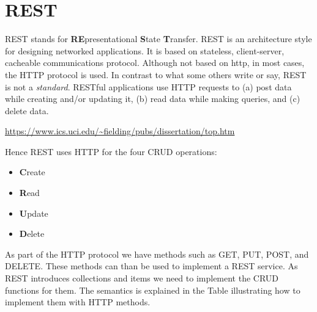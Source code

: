 

\chapter{REST}

\FILENAME

REST stands for {\bf RE}presentational {\bf S}tate {\bf
  T}ransfer. REST is an architecture style for designing networked
applications. It is based on stateless, client-server, cacheable
communications protocol. Although not based on http, in most cases,
the HTTP protocol is used. In contrast to what some others write or
say, REST is not a \emph{standard}. RESTful applications use HTTP
requests to (a) post data while creating and/or updating it, (b) read
data while making queries, and (c) delete data.

\url{https://www.ics.uci.edu/~fielding/pubs/dissertation/top.htm}

Hence REST uses HTTP for the four CRUD operations:

\begin{itemize}
\item  {\bf C}reate
\item  {\bf R}ead
\item  {\bf U}pdate
\item  {\bf D}elete
\end{itemize}

As part of the HTTP protocol we have methods such as GET, PUT, POST, and
DELETE. These methods can than be used to implement a REST service. As
REST introduces collections and items we need to implement the CRUD
functions for them. The semantics is explained in the Table
illustrating how to implement them with HTTP methods.

